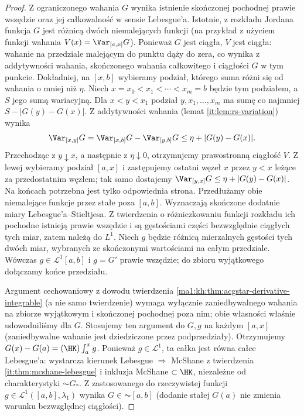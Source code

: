 \begin{proof}
Z ograniczonego wahania $G$ wynika istnienie skończonej pochodnej prawie wszędzie oraz jej całkowalność w sensie Lebesgue'a. Istotnie, z rozkładu Jordana funkcja $G$ jest różnicą dwóch niemalejących funkcji (na przykład z użyciem funkcji wahania $V(x)=\Var_{[a,x]}G$). Ponieważ $G$ jest ciągła, $V$ jest ciągła: wahanie na przedziale malejącym do punktu dąży do zera, co wynika z addytywności wahania, skończonego wahania całkowitego i ciągłości $G$ w tym punkcie. Dokładniej, na $[x,b]$ wybieramy podział, którego suma różni się od wahania o mniej niż $\eta$. Niech $x=x_0<x_1<\cdots<x_m=b$ będzie tym podziałem, a $S$ jego sumą wariacyjną. Dla $x<y<x_1$ podział $y,x_1,\ldots,x_m$ ma sumę co najmniej $S-|G(y)-G(x)|$. Z addytywności wahania (lemat \ref{it:lem:rs-variation}) wynika
\[
 \Var_{[x,y]}G=\Var_{[x,b]}G-\Var_{[y,b]}G
 \le\eta+|G(y)-G(x)|.
\]
Przechodząc z $y\downarrow x$, a następnie z $\eta\downarrow0$, otrzymujemy prawostronną ciągłość $V$. Z lewej wybieramy podział $[a,x]$ i zastępujemy ostatni węzeł $x$ przez $y<x$ leżące za przedostatnim węzłem; tak samo dostajemy $\Var_{[y,x]}G\le\eta+|G(y)-G(x)|$. Na końcach potrzebna jest tylko odpowiednia strona. Przedłużamy obie niemalejące funkcje przez stałe poza $[a,b]$. Wyznaczają skończone dodatnie miary Lebesgue'a--Stieltjesa. Z twierdzenia  o różniczkowaniu funkcji rozkładu ich pochodne istnieją prawie wszędzie i są gęstościami części bezwzględnie ciągłych tych miar, zatem należą do $L^1$. Niech $g$ będzie różnicą mierzalnych gęstości tych dwóch miar, wybranych ze skończonymi wartościami na całym przedziale. Wówczas $g\in\mathcal L^1[a,b]$ i $g=G'$ prawie wszędzie; do zbioru wyjątkowego dołączamy końce przedziału.

Argument cechowaniowy z dowodu twierdzenia \ref{ma1:kh:thm:acgstar-derivative-integrable} (a nie samo twierdzenie) wymaga wyłącznie zaniedbywalnego wahania na zbiorze wyjątkowym i skończonej pochodnej poza nim; obie własności właśnie udowodniliśmy dla $G$. Stosujemy ten argument do $G,g$ na każdym $[a,x]$ (zaniedbywalne wahanie jest dziedziczone przez podprzedziały). Otrzymujemy $G(x)-G(a)=(\HK)\int_a^x g$. Ponieważ $g\in\mathcal L^1$, ta całka jest równa całce Lebesgue'a: wystarcza kierunek Lebesgue $\Rightarrow$ McShane z twierdzenia \ref{it:thm:mcshane-lebesgue} i inkluzja McShane $\subset\HK$, niezależne od charakterystyki $\AC G_*$. Z  zastosowanego do rzeczywistej funkcji $g\in\mathcal L^1([a,b],\lambda_1)$ wynika $G\in\AC[a,b]$ (dodanie stałej $G(a)$ nie zmienia warunku bezwzględnej ciągłości).


\end{proof}
